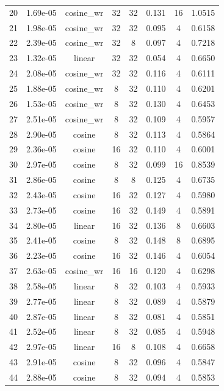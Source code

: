 \begin{table}[H]
{\begin{tabular}{c c c c c c c c}
20 & 1.69e-05 & cosine\_wr & 32 & 32 & 0.131 & 16 & 1.0515 \\
21 & 1.98e-05 & cosine\_wr & 32 & 32 & 0.095 & 4  & 0.6158 \\
22 & 2.39e-05 & cosine\_wr & 32 & 8  & 0.097 & 4  & 0.7218 \\

23 & 1.32e-05 & linear & 32 & 32 & 0.054 & 4  & 0.6650 \\
24 & 2.08e-05 & cosine\_wr & 32 & 32 & 0.116 & 4  & 0.6111 \\
25 & 1.88e-05 & cosine\_wr & 8  & 32 & 0.110 & 4  & 0.6201 \\
26 & 1.53e-05 & cosine\_wr & 8  & 32 & 0.130 & 4  & 0.6453 \\
27 & 2.51e-05 & cosine\_wr & 8  & 32 & 0.109 & 4  & 0.5957 \\
28 & 2.90e-05 & cosine & 8  & 32 & 0.113 & 4  & 0.5864 \\
29 & 2.36e-05 & cosine & 16 & 32 & 0.110 & 4  & 0.6001 \\
30 & 2.97e-05 & cosine & 8  & 32 & 0.099 & 16 & 0.8539 \\
31 & 2.86e-05 & cosine & 8  & 8  & 0.125 & 4  & 0.6735 \\
32 & 2.43e-05 & cosine & 16 & 32 & 0.127 & 4  & 0.5980 \\
33 & 2.73e-05 & cosine & 16 & 32 & 0.149 & 4  & 0.5891 \\
34 & 2.80e-05 & linear & 16 & 32 & 0.136 & 8  & 0.6603 \\
35 & 2.41e-05 & cosine & 8  & 32 & 0.148 & 8  & 0.6895 \\
36 & 2.23e-05 & cosine & 16 & 32 & 0.146 & 4  & 0.6054 \\
37 & 2.63e-05 & cosine\_wr & 16 & 16 & 0.120 & 4  & 0.6298 \\
38 & 2.58e-05 & linear & 8  & 32 & 0.103 & 4  & 0.5933 \\
39 & 2.77e-05 & linear & 8  & 32 & 0.089 & 4  & 0.5879 \\
40 & 2.87e-05 & linear & 8  & 32 & 0.081 & 4  & 0.5851 \\
41 & 2.52e-05 & linear & 8  & 32 & 0.085 & 4  & 0.5948 \\
42 & 2.97e-05 & linear & 16 & 8  & 0.108 & 4  & 0.6658 \\
43 & 2.91e-05 & cosine & 8  & 32 & 0.096 & 4  & 0.5847 \\
44 & 2.88e-05 & cosine & 8  & 32 & 0.094 & 4  & 0.5853 \\

\hline
\end{tabular}
}
\end{table}

